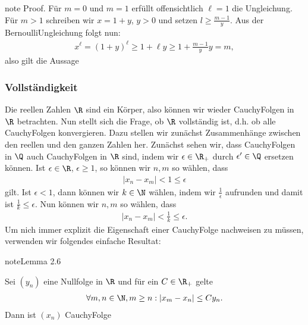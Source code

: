 \documentclass[letterpaper,10pt,english]{jupyterBook}
\begin{document}
\begin{sphinxadmonition}{note}
Proof.  Für \(m=0\) und \(m=1\) erfüllt offensichtlich \(\ell=1\) die Ungleichung. Für \(m > 1\) schreiben wir \(x=1+y\), \(y > 0\) und setzen \(l \geq \frac{m-1}y\). Aus der Bernoulli\sphinxhyphen{}Ungleichung folgt nun:
\begin{equation*}
\begin{split}x^\ell =(1+y)^\ell \geq 1+ \ell y \geq 1+  \frac{m-1}y y = m,\end{split}
\end{equation*}
also gilt die Aussage
\end{sphinxadmonition}


\subsubsection{Vollständigkeit}
\label{\detokenize{grundlagen/zahlensysteme:vollstandigkeit}}
Die reellen Zahlen \(\R\) sind ein Körper, also können wir wieder Cauchy\sphinxhyphen{}Folgen in \(\R\) betrachten. Nun stellt sich die Frage, ob \(\R\) vollständig ist, d.h. ob alle Cauchy\sphinxhyphen{}Folgen konvergieren. Dazu stellen wir zunächst Zusammenhänge zwischen den reellen und den ganzen Zahlen her. Zunächst sehen wir, dass Cauchy\sphinxhyphen{}Folgen in \(\Q\) auch Cauchy\sphinxhyphen{}Folgen in \(\R\) sind, indem wir \(\epsilon \in \R_+\) durch \(\epsilon' \in \Q\) ersetzen können. Ist \(\epsilon \in \R\), \(\epsilon \geq 1\), so können wir \(n,m\) so wählen, dass
\begin{equation*}
\begin{split}|x_n -x_m| < 1 \leq \epsilon\end{split}
\end{equation*}
gilt. Ist \(\epsilon < 1\), dann können wir \(k \in \N\) wählen, indem wir \(\frac{1}\epsilon\) aufrunden und damit ist
\(\frac{1}k \leq \epsilon\). Nun können wir \(n,m\) so wählen, dass
\begin{equation*}
\begin{split}|x_n -x_m| < \frac{1}k \leq \epsilon.\end{split}
\end{equation*}
Um nich immer explizit die Eigenschaft einer Cauchy\sphinxhyphen{}Folge nachweisen zu müssen, verwenden wir folgendes einfache Resultat:
\label{grundlagen/zahlensysteme:lemma-22}
\begin{sphinxadmonition}{note}{Lemma 2.6}



Sei \((y_n)\) eine Nullfolge in \(\R\) und für ein \(C \in \R_+\) gelte
\begin{equation*}
\begin{split}\forall m,n \in \N, m \geq n: |x_m-x_n| \leq C y_n.\end{split}
\end{equation*}
Dann ist \((x_n)\) Cauchy\sphinxhyphen{}Folge
\end{sphinxadmonition}
\end{document}
